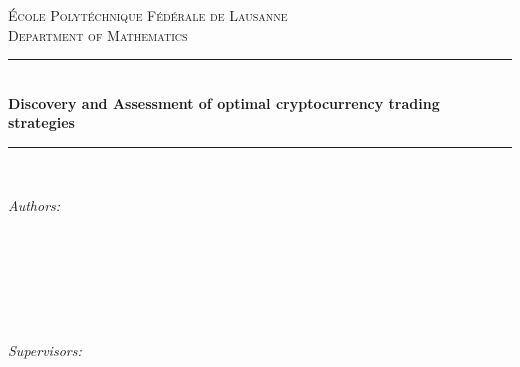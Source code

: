 \begin{titlepage}

\newcommand{\HRule}{\rule{\linewidth}{0.5mm}} %




\center %


\textsc{\Large École Polytéchnique Fédérale de Lausanne}\\[0.5cm] 
\textsc{\large Department of Mathematics}\\[0.5cm] 


\HRule \\[0.4cm]
{ \huge \bfseries Discovery and Assessment of optimal cryptocurrency trading strategies \reporttitle}\\ %
\HRule \\[1.5cm]
 

\begin{minipage}{0.4\textwidth}
\begin{flushleft} \large
\emph{Authors:}\\
\reportauthor\\ %
\reportsecondauthor\\
\reportthirdauthor\\
\reportfourthauthor\\
\reportfifthauthor
\end{flushleft}
\end{minipage}
~
\begin{minipage}{0.4\textwidth}
\begin{flushright} \large
\emph{Supervisors:} \\
\supervisor %
\end{flushright}
\end{minipage}\\[4cm]



\end{titlepage}
